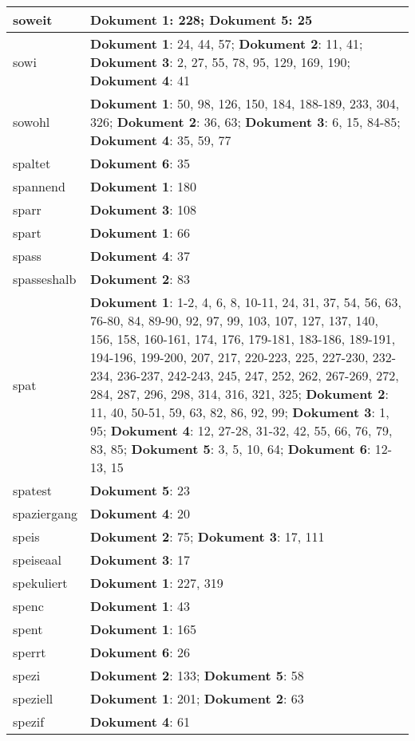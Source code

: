 \documentclass[a5paper]{article}
\begin{document}
\begin{longtable}[l]{|l|p{3in}|}
\hline
soweit & \textbf{Dokument 1}: 228; \textbf{Dokument 5}: 25 \\
\hline
sowi & \textbf{Dokument 1}: 24, 44, 57; \textbf{Dokument 2}: 11, 41; \textbf{Dokument 3}: 2, 27, 55, 78, 95, 129, 169, 190; \textbf{Dokument 4}: 41 \\
\hline
sowohl & \textbf{Dokument 1}: 50, 98, 126, 150, 184, 188-189, 233, 304, 326; \textbf{Dokument 2}: 36, 63; \textbf{Dokument 3}: 6, 15, 84-85; \textbf{Dokument 4}: 35, 59, 77 \\
\hline
spaltet & \textbf{Dokument 6}: 35 \\
\hline
spannend & \textbf{Dokument 1}: 180 \\
\hline
sparr & \textbf{Dokument 3}: 108 \\
\hline
spart & \textbf{Dokument 1}: 66 \\
\hline
spass & \textbf{Dokument 4}: 37 \\
\hline
spasseshalb & \textbf{Dokument 2}: 83 \\
\hline
spat & \textbf{Dokument 1}: 1-2, 4, 6, 8, 10-11, 24, 31, 37, 54, 56, 63, 76-80, 84, 89-90, 92, 97, 99, 103, 107, 127, 137, 140, 156, 158, 160-161, 174, 176, 179-181, 183-186, 189-191, 194-196, 199-200, 207, 217, 220-223, 225, 227-230, 232-234, 236-237, 242-243, 245, 247, 252, 262, 267-269, 272, 284, 287, 296, 298, 314, 316, 321, 325; \textbf{Dokument 2}: 11, 40, 50-51, 59, 63, 82, 86, 92, 99; \textbf{Dokument 3}: 1, 95; \textbf{Dokument 4}: 12, 27-28, 31-32, 42, 55, 66, 76, 79, 83, 85; \textbf{Dokument 5}: 3, 5, 10, 64; \textbf{Dokument 6}: 12-13, 15 \\
\hline
spatest & \textbf{Dokument 5}: 23 \\
\hline
spaziergang & \textbf{Dokument 4}: 20 \\
\hline
speis & \textbf{Dokument 2}: 75; \textbf{Dokument 3}: 17, 111 \\
\hline
speiseaal & \textbf{Dokument 3}: 17 \\
\hline
spekuliert & \textbf{Dokument 1}: 227, 319 \\
\hline
spenc & \textbf{Dokument 1}: 43 \\
\hline
spent & \textbf{Dokument 1}: 165 \\
\hline
sperrt & \textbf{Dokument 6}: 26 \\
\hline
spezi & \textbf{Dokument 2}: 133; \textbf{Dokument 5}: 58 \\
\hline
speziell & \textbf{Dokument 1}: 201; \textbf{Dokument 2}: 63 \\
\hline
spezif & \textbf{Dokument 4}: 61 \\

\end{longtable}
\end{document}
